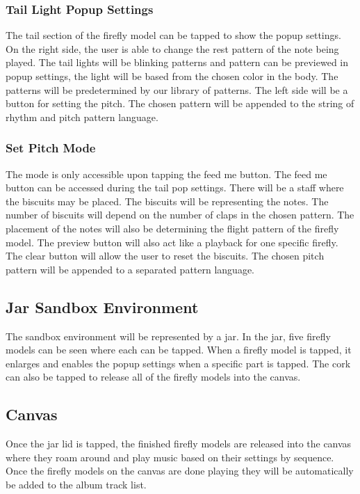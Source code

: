 \subsubsection{Tail Light Popup Settings}
The tail section of the firefly model can be tapped to show the popup settings. On the right side, the user is able to change the rest pattern of the note being played. The tail lights will be blinking patterns and pattern can be previewed in popup settings, the light will be based from the chosen color in the body. The patterns will be predetermined by our library of patterns. The left side will be a button for setting the pitch. The chosen pattern will be appended to the string of rhythm and pitch pattern language.

\subsubsection{Set Pitch Mode}
The mode is only accessible upon tapping the feed me button. The feed me button can be accessed during the tail pop settings. There will be a staff where the biscuits may be placed. The biscuits will be representing the notes. The number of biscuits will depend on the number of claps in the chosen pattern. The placement of the notes will also be determining the flight pattern of the firefly model. The preview button will also act like a playback for one specific firefly. The clear button will allow the user to reset the biscuits. The chosen pitch pattern will be appended to a separated pattern language.

\subsection{Jar Sandbox Environment}
The sandbox environment will be represented by a jar. In the jar, five firefly models can be seen where each can be tapped. When a firefly model is tapped, it enlarges and enables the popup settings when a specific part is tapped. The cork can also be tapped to release all of the firefly models into the canvas.

\subsection{Canvas}
Once the jar lid is tapped, the finished firefly models are released into the canvas where they roam around and play music based on their settings by sequence. Once the firefly models on the canvas are done playing they will be automatically be added to the album track list.

